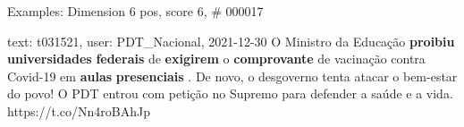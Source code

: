 \begin{frame}{Examples: Dimension 6 pos, score 6, \# 000017}
\footnotesize
\begin{exampleblock}{text: t031521, user: PDT\_Nacional, 2021-12-30}
O Ministro da Educação \textbf{proibiu} \textbf{universidades} 
\textbf{federais} de \textbf{exigirem} o \textbf{comprovante} de vacinação 
contra Covid-19 em \textbf{aulas} \textbf{presenciais} . De novo, o desgoverno 
tenta atacar o bem-estar do povo! O PDT entrou com petição no Supremo para 
defender a saúde e a vida. https://t.co/Nn4roBAhJp 
\end{exampleblock}
\end{frame}
